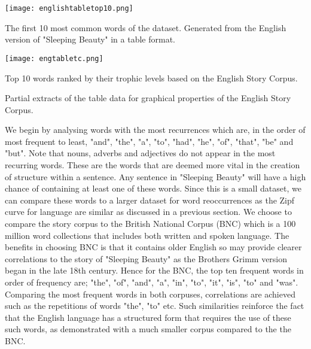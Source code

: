 \begin{table}[H]
\centering
\begin{subtable}{.45\textwidth}
	\texttt{[image: englishtabletop10.png]}
	\caption{The first 10 most common words of the dataset. Generated from the English version of "Sleeping Beauty" in a table format. }
	\label{table:englishtop}
\end{subtable}
\hfill
\begin{subtable}{.45\textwidth}
	\hspace{1.5cm} 
	\texttt{[image: engtabletc.png]}
	\caption{Top 10 words ranked by their trophic levels based on the English Story Corpus.}
	\label{table:englishtoptc}
\end{subtable}
\caption{Partial extracts of the table data for graphical properties of the English Story Corpus.}
\end{table}

We begin by analysing words with the most recurrences which are, in the order of most frequent to least, "and", "the", "a", "to", "had", "he", "of", "that", "be" and "but". Note that nouns, adverbs and adjectives do not appear in the most recurring words. These are the words that are deemed more vital in the creation of structure within a sentence. Any sentence in "Sleeping Beauty" will have a high chance of containing at least one of these words. Since this is a small dataset, we can compare these words to a larger dataset for word reoccurrences as the Zipf curve for language are similar as discussed in a previous section. We choose to compare the story corpus to the British National Corpus (BNC)\cite{bnc2007british} which is a 100 million word collections that includes both written and spoken language. The benefits in choosing BNC is that it contains older English so may provide clearer correlations to the story of "Sleeping Beauty" as the Brothers Grimm version began in the late 18th century. Hence for the BNC, the top ten frequent words\cite{leech2014word} in order of frequency are; "the", "of", "and", "a", "in", "to", "it", "is", "to" and "was". Comparing the most frequent words in both corpuses, correlations are achieved such as the repetitions of words "the", "to" etc. Such similarities reinforce the fact that the English language has a structured form that requires the use of these such words, as demonstrated with a much smaller corpus compared to the the BNC.

